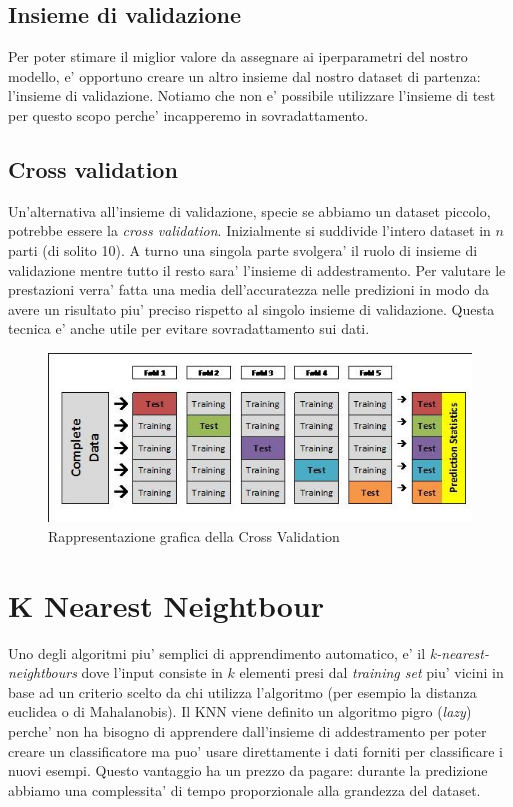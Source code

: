 \subsection{Insieme di validazione}
Per poter stimare il miglior valore da assegnare ai iperparametri del nostro modello, e' opportuno creare un altro insieme dal nostro dataset di partenza: l'insieme di validazione. Notiamo che non e' possibile utilizzare l'insieme di test per questo scopo perche' incapperemo in sovradattamento.

\subsection{Cross validation}
Un'alternativa all'insieme di validazione, specie se abbiamo un dataset piccolo, potrebbe essere la \textit{cross validation}. Inizialmente si suddivide l'intero dataset in $n$ parti (di solito 10). A turno una singola parte svolgera' il ruolo di insieme di validazione mentre tutto il resto sara' l'insieme di addestramento. Per valutare le prestazioni verra' fatta una media dell'accuratezza nelle predizioni in modo da avere un risultato piu' preciso rispetto al singolo insieme di validazione. Questa tecnica e' anche utile per evitare sovradattamento sui dati.

\begin{figure}[H]
	\centering
	\includegraphics[width=0.7\linewidth]{img/crossvalidation}
	\caption{Rappresentazione grafica della Cross Validation}
	\label{fig:crossvalidation}
\end{figure}


\section{K Nearest Neightbour}
Uno degli algoritmi piu' semplici di apprendimento automatico, e' il \textit{k-nearest-neightbours} dove l'input consiste in $k$ elementi presi dal \textit{training set} piu' vicini in base ad un criterio scelto da chi utilizza l'algoritmo (per esempio la distanza euclidea o di Mahalanobis). Il KNN viene definito un algoritmo pigro (\textit{lazy}) perche' non ha bisogno di apprendere dall'insieme di addestramento per poter creare un classificatore ma puo' usare direttamente i dati forniti per classificare i nuovi esempi. Questo vantaggio ha un prezzo da pagare: durante la predizione abbiamo una complessita' di tempo proporzionale alla grandezza del dataset.


